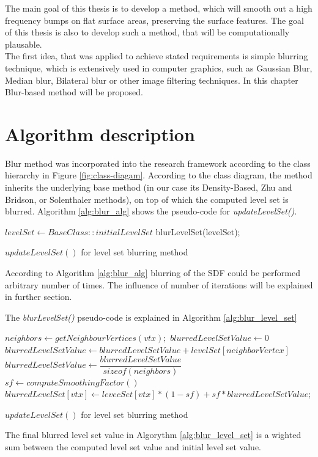 The main goal of this thesis is to develop a method, which will smooth out a high frequency bumps on flat surface areas, preserving the surface features. The goal of this thesis is also to develop such a method, that will be computationally plausable.\\
The first idea, that was applied to achieve stated requirements is simple blurring technique, which is extensively used in computer graphics, such as Gaussian Blur, Median blur, Bilateral blur or other image filtering techniques. In this chapter Blur-based method will be proposed. 
\section{Algorithm description}
Blur method was incorporated into the research framework according to the class hierarchy in Figure \ref{fig:class-diagam}. According to the class diagram, the method inherits the underlying base method (in our case its Density-Based, Zhu and Bridson, or Solenthaler methods), on top of which the computed level set is blurred.  Algorithm \ref{alg:blur_alg} shows the pseudo-code for \emph{updateLevelSet()}.
\begin{algorithm}[H]
	\scriptsize
	\begin{algorithmic}
		\State $levelSet \gets  BaseClass::initialLevelSet$
			\State blurLevelSet(levelSet);
		\EndFor
	\end{algorithmic}
	\caption{$updateLevelSet()$ for level set blurring method}
	\label{alg:blur_alg}
\end{algorithm}
According to Algorithm \ref{alg:blur_alg} blurring of the SDF could be performed arbitrary number of times. The influence of number of iterations will be explained in further section.

The \emph{blurLevelSet()} pseudo-code is explained in Algorithm \ref{alg:blur_level_set}
\begin{algorithm}[H]
	\scriptsize
	\begin{algorithmic}
		\ForAll{$vtx \in MC\_CellDomain$}
			\State $neighbors \gets getNeighbourVertices(vtx);$
			\State $blurredLevelSetValue \gets 0$
			\ForAll{$nbVtx \in neighbors$}
				\State $blurredLevelSetValue\gets blurredLevelSetValue + levelSet[neighborVertex]$
			\EndFor
			\State $blurredLevelSetValue\gets\dfrac{blurredLevelSetValue}{sizeof(neighbors)}$
			\State $sf\gets computeSmoothingFactor()$
			\State $blurredLevelSet[vtx]\gets levecSet[vtx] * (1 - sf) + sf * blurredLevelSetValue;$
		\EndFor
	\end{algorithmic}
	\caption{$updateLevelSet()$ for level set blurring method}
	\label{alg:blur_level_set}
\end{algorithm}
The final blurred level set value in Algorythm \ref{alg:blur_level_set} is a wighted sum between the computed level set value and initial level set value.
